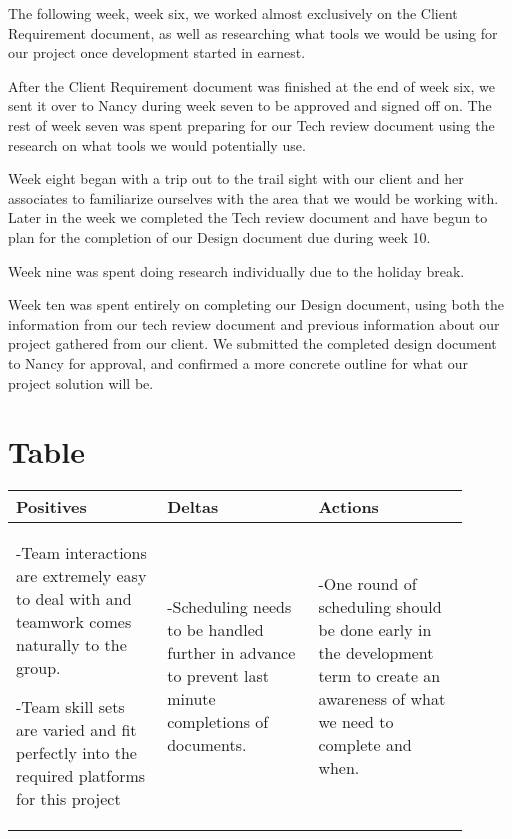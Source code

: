 \documentclass[letterpaper, 10pt,titlepage]{article}
\begin{document}
The following week, week six, we worked almost exclusively on the Client Requirement document, as well as researching what tools we would be using for our project once development started in earnest.

After the Client Requirement document was finished at the end of week six, we sent it over to Nancy during week seven to be approved and signed off on. The rest of week seven was spent preparing for our Tech review document using the research on what tools we would potentially use. 

Week eight began with a trip out to the trail sight with our client and her associates to familiarize ourselves with the area that we would be working with. Later in the week we completed the Tech review document and have begun to plan for the completion of our Design document due during week 10.

Week nine was spent doing research individually due to the holiday break. 

Week ten was spent entirely on completing our Design document, using both the information from our tech review document and previous information about our project gathered from our client. We submitted the completed design document to Nancy for approval, and confirmed a more concrete outline for what our project solution will be. 





\section{Table}
\begin{tabular}{|p{0.3\linewidth}|p{0.3\linewidth}|p{0.3\linewidth}|}
\hline
\centering Positives &
\centering Deltas &   
\centering Actions \tabularnewline
\hline
-Team interactions are extremely easy to deal with and teamwork comes naturally to the group. 
\vspace{0.2cm}

-Team skill sets are varied and fit perfectly into the required platforms for this project& 

-Scheduling needs to be handled further in advance to prevent last minute completions of documents.& 

-One round of scheduling should be done early in the development term to create an awareness of what we need to complete and when. 
\tabularnewline
\hline
\end{tabular}
\end{document}

